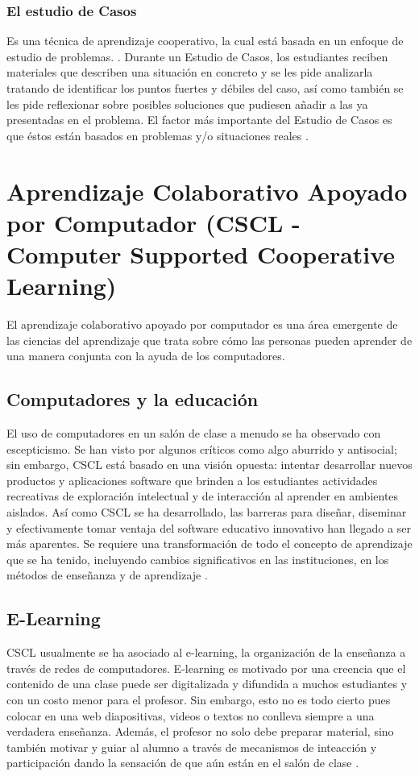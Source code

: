 \subsubsection{El estudio de Casos}
Es una técnica de aprendizaje cooperativo, la cual está basada en un enfoque de estudio de problemas. \cite{JCAL:JCAL119}. Durante un Estudio de Casos, los estudiantes reciben materiales que describen una situación en concreto y se les pide analizarla tratando de identificar los puntos fuertes y débiles del caso, así como también se les pide reflexionar sobre posibles soluciones que pudiesen añadir a las ya presentadas en el problema. El factor más importante del Estudio de Casos es que éstos están basados en problemas y/o situaciones reales \cite{JCAL:JCAL119}.

\section{Aprendizaje Colaborativo Apoyado por Computador (CSCL - Computer Supported Cooperative Learning)}
El aprendizaje colaborativo apoyado por computador es una área emergente de las ciencias del aprendizaje que trata sobre cómo las personas pueden aprender de una manera conjunta con la ayuda de los computadores.

\subsection{Computadores y la educación}
El uso de computadores en un salón de clase a menudo se ha observado con escepticismo. Se han visto por algunos críticos como algo aburrido y antisocial; sin embargo, CSCL está basado en una visión opuesta: intentar desarrollar nuevos productos y aplicaciones software que brinden a los estudiantes actividades recreativas de exploración intelectual y de interacción al aprender en ambientes aislados. Así como CSCL se ha desarrollado, las barreras para diseñar, diseminar y efectivamente tomar ventaja del software educativo innovativo han llegado a ser más aparentes. Se requiere una transformación de todo el concepto de aprendizaje que se ha tenido, incluyendo cambios significativos en las instituciones, en los métodos de enseñanza y de aprendizaje \cite{stahl_computer_2006}.

\subsection{E-Learning}
CSCL usualmente se ha asociado al e-learning, la organización de la enseñanza a través de redes de computadores. E-learning es motivado por una creencia que el contenido de una clase puede ser digitalizada y difundida a muchos estudiantes y con un costo menor para el profesor. Sin embargo, esto no es todo cierto pues colocar en una web diapositivas, videos o textos no conlleva siempre a una verdadera enseñanza. Además, el profesor no solo debe preparar material, sino también motivar y guiar al alumno a través de mecanismos de inteacción y participación dando la sensación de que aún están en el salón de clase \cite{stahl_computer_2006}.



